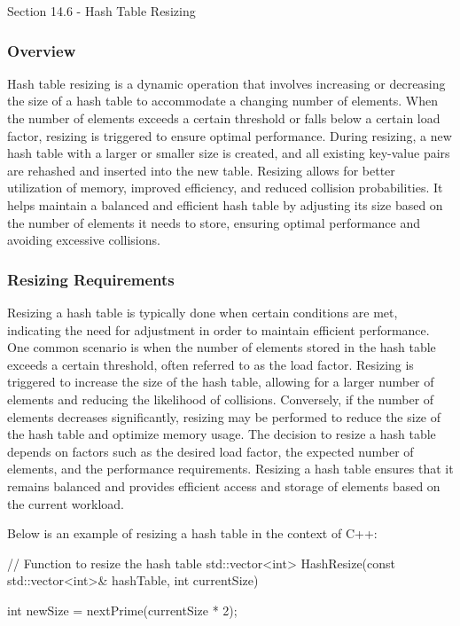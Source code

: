 \begin{notes}{Section 14.6 - Hash Table Resizing}
    \subsubsection*{Overview}

    Hash table resizing is a dynamic operation that involves increasing or decreasing the size of a hash table to accommodate a changing number of elements. When the number of elements exceeds a certain threshold or 
    falls below a certain load factor, resizing is triggered to ensure optimal performance. During resizing, a new hash table with a larger or smaller size is created, and all existing key-value pairs are rehashed and 
    inserted into the new table. Resizing allows for better utilization of memory, improved efficiency, and reduced collision probabilities. It helps maintain a balanced and efficient hash table by adjusting its size 
    based on the number of elements it needs to store, ensuring optimal performance and avoiding excessive collisions.
    
    \subsubsection*{Resizing Requirements}
    
    Resizing a hash table is typically done when certain conditions are met, indicating the need for adjustment in order to maintain efficient performance. One common scenario is when the number of elements stored 
    in the hash table exceeds a certain threshold, often referred to as the load factor. Resizing is triggered to increase the size of the hash table, allowing for a larger number of elements and reducing the 
    likelihood of collisions. Conversely, if the number of elements decreases significantly, resizing may be performed to reduce the size of the hash table and optimize memory usage. The decision to resize a hash 
    table depends on factors such as the desired load factor, the expected number of elements, and the performance requirements. Resizing a hash table ensures that it remains balanced and provides efficient access 
    and storage of elements based on the current workload.
    
    \begin{highlight}
        Below is an example of resizing a hash table in the context of C++:
    
    \begin{code}[C++]
    // Function to resize the hash table
    std::vector<int> HashResize(const std::vector<int>& hashTable, int currentSize) {
        int newSize = nextPrime(currentSize * 2);
    
}
\end{code}
\end{highlight}
\end{notes}
